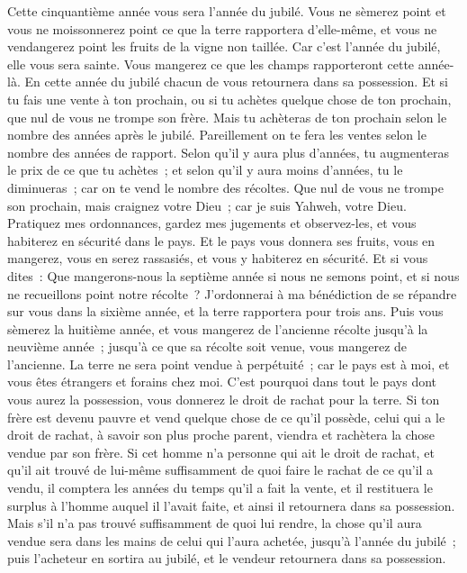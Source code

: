 \begin{multicols}{2}
Cette cinquantième année vous sera l'année du jubilé. Vous ne sèmerez point et vous ne moissonnerez point ce que la terre rapportera d'elle-même, et vous ne vendangerez point les fruits de la vigne non taillée.
Car c'est l'année du jubilé, elle vous sera sainte. Vous mangerez ce que les champs rapporteront cette année-là.
En cette année du jubilé chacun de vous retournera dans sa possession.
Et si tu fais une vente à ton prochain, ou si tu achètes quelque chose de ton prochain, que nul de vous ne trompe son frère.
Mais tu achèteras de ton prochain selon le nombre des années après le jubilé. Pareillement on te fera les ventes selon le nombre des années de rapport.
Selon qu'il y aura plus d'années, tu augmenteras le prix de ce que tu achètes~; et selon qu'il y aura moins d'années, tu le diminueras~; car on te vend le nombre des récoltes.
Que nul de vous ne trompe son prochain, mais craignez votre Dieu~; car je suis Yahweh, votre Dieu.
Pratiquez mes ordonnances, gardez mes jugements et observez-les, et vous habiterez en sécurité dans le pays.
Et le pays vous donnera ses fruits, vous en mangerez, vous en serez rassasiés, et vous y habiterez en sécurité.
Et si vous dites~: Que mangerons-nous la septième année si nous ne semons point, et si nous ne recueillons point notre récolte~?
J'ordonnerai à ma bénédiction de se répandre sur vous dans la sixième année, et la terre rapportera pour trois ans.
Puis vous sèmerez la huitième année, et vous mangerez de l'ancienne récolte jusqu'à la neuvième année~; jusqu'à ce que sa récolte soit venue, vous mangerez de l'ancienne.
La terre ne sera point vendue à perpétuité~; car le pays est à moi, et vous êtes étrangers et forains chez moi.
C'est pourquoi dans tout le pays dont vous aurez la possession, vous donnerez le droit de rachat pour la terre.
Si ton frère est devenu pauvre et vend quelque chose de ce qu'il possède, celui qui a le droit de rachat, à savoir son plus proche parent, viendra et rachètera la chose vendue par son frère.
Si cet homme n'a personne qui ait le droit de rachat, et qu'il ait trouvé de lui-même suffisamment de quoi faire le rachat de ce qu'il a vendu,
il comptera les années du temps qu'il a fait la vente, et il restituera le surplus à l'homme auquel il l'avait faite, et ainsi il retournera dans sa possession.
Mais s'il n'a pas trouvé suffisamment de quoi lui rendre, la chose qu'il aura vendue sera dans les mains de celui qui l'aura achetée, jusqu'à l'année du jubilé~; puis l'acheteur en sortira au jubilé, et le vendeur retournera dans sa possession.

\end{multicols}
